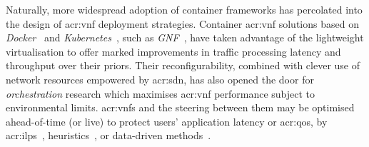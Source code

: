 Naturally, more widespread adoption of container frameworks has percolated into the design of \gls{acr:vnf} deployment strategies.
Container \gls{acr:vnf} solutions based on \emph{Docker}~\parencite{docker} and \emph{Kubernetes}~\parencite{k8s}, such as \emph{GNF}~\parencite{DBLP:conf/iscc/CzivaJWP15,DBLP:journals/cm/CzivaP17}, have taken advantage of the lightweight virtualisation to offer marked improvements in traffic processing latency and throughput over their priors.
Their reconfigurability, combined with clever use of network resources empowered by \gls{acr:sdn}, has also opened the door for \emph{orchestration} research which maximises \gls{acr:vnf} performance subject to environmental limits.
\glspl{acr:vnf} and the steering between them may be optimised ahead-of-time (or live) to protect users' application latency or \gls{acr:qos}, by \glspl{acr:ilp}~\parencite{DBLP:conf/infocom/CzivaAP18}, heuristics~\parencite{DBLP:conf/im/Iordache-SicaAP21}, or data-driven methods~\parencite{DBLP:conf/netsoft/RieraBBDMPLGPCP16}.







